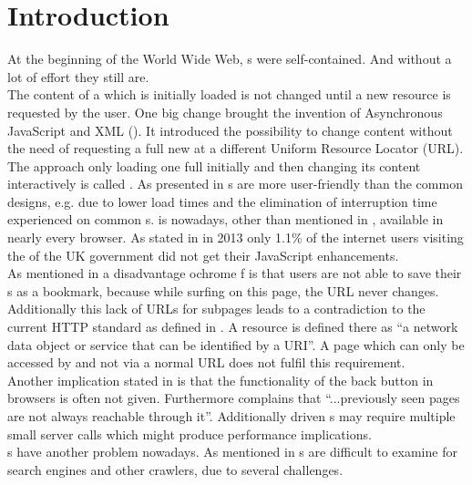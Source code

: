 \section{Introduction\label{chap:introduction}}
At the beginning of the World Wide Web, \webPage{}s were self-contained. 
And without a lot of effort they still are. 
\\
The content of a \webPage{} which is initially loaded is not changed until a new resource is requested by the user.
One big change brought the invention of Asynchronous JavaScript and XML (\ajax{}).
It introduced the possibility to change content without the need of requesting a full new \webPage{} at a different Uniform Resource Locator (URL).
The approach only loading one full \webPage{} initially and then changing its content interactively is called \singlePageApplication{}.
As presented in \cite{jonsson2009database} \singlePageApplication{}s are more user-friendly than the common designs, e.g. due to lower load times and the elimination of interruption time experienced on common \webApplication{}s.
\ajax{} is nowadays, other than mentioned in \cite{jonsson2009database}, available in nearly every browser.
As stated in \cite{herlihy2013howmany} in 2013 only 1.1\% of the internet users visiting the \webSite{} of the UK government did not get their JavaScript enhancements.
\\
As mentioned in \cite{jonsson2009database} a disadvantage ochrome
f \ajax{} is that users are not able to save their \webSite{}s as a bookmark, because while surfing on this page, the URL never changes.
Additionally this lack of URLs for subpages leads to a contradiction to the current HTTP standard as defined in \cite{fielding1999hypertext}.
A resource is defined there as \enquote{a network data object or service that can be identified by a URI}.
A page which can only be accessed by \ajax{} and not via a normal URL does not fulfil this requirement.
\\
Another implication stated in \cite{jonsson2009database} is that the functionality of the back button in browsers is often not given.
Furthermore \cite{estrada2011take} complains that \enquote{...previously seen pages are not always reachable through it}.
Additionally \ajax{} driven \webApplication{}s may require multiple small server calls which might produce performance implications.
\\
\SinglePageApplication{}s have another problem nowadays. 
As mentioned in \cite{matter2008ajax} \ajax{} \webSite{}s are difficult to examine for search engines and other crawlers, due to several challenges.
